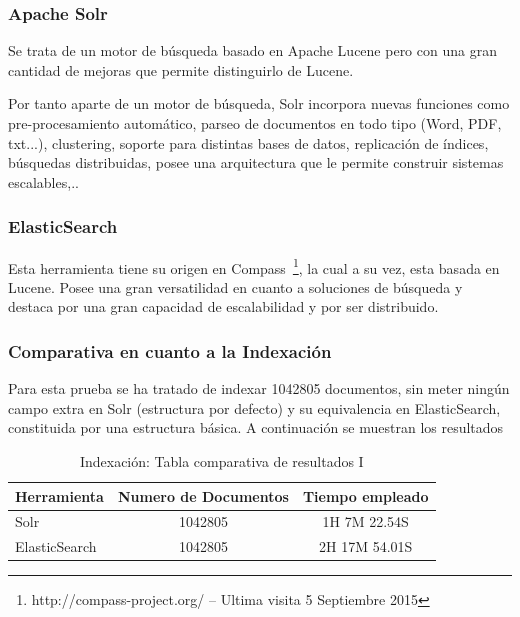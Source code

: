 \documentclass[runningheads,a4paper]{llncs}
\theoremstyle{break}
\newcommand{\rowstyle}[1]{\gdef\currentrowstyle{#1}%
  #1\ignorespaces
}
\begin{document}
\subsubsection{Apache Solr}
\textbf{}

Se trata de un motor de búsqueda basado en Apache Lucene pero con una gran cantidad de mejoras que permite distinguirlo de Lucene. 

Por tanto aparte de un motor de búsqueda, Solr incorpora nuevas funciones como pre-procesamiento automático, parseo de documentos en todo tipo (Word, PDF, txt...), clustering, soporte para distintas bases de datos, replicación de índices, búsquedas distribuidas, posee una arquitectura que le permite construir sistemas escalables,..


\subsubsection{ElasticSearch}
\textbf{}

Esta herramienta tiene su origen en Compass~\footnote{http://compass-project.org/ -- Ultima visita 5 Septiembre 2015}, la cual a su vez, esta basada en Lucene. Posee una gran versatilidad en cuanto a soluciones de búsqueda y destaca por una gran capacidad de escalabilidad y por ser distribuido.

\subsubsection{Comparativa en cuanto a la Indexación}
\textbf{}

Para esta prueba se ha tratado de indexar 1042805 documentos, sin meter ningún campo extra en Solr (estructura por defecto) y su equivalencia en ElasticSearch, constituida por una estructura básica. A continuación se muestran los resultados

\bgroup
\setlength{\tabcolsep}{10pt}
\def\arraystretch{1.8}
\begin{table}
\begin{center}
\begin{tabular}{p{2.2cm}|c|c}

\rowstyle{\bfseries} Herramienta & \rowstyle{\bfseries} Numero de Documentos & \rowstyle{\bfseries} Tiempo empleado \\ \hline
Solr          & 1042805 & 1H 7M 22.54S \\
ElasticSearch & 1042805 & 2H 17M 54.01S \\ \hline
\end{tabular}
\end{center}
\vspace{1em}
\caption{Indexación: Tabla comparativa de resultados I}
\end{table}
\egroup
\vspace{-1.5em}
\end{document}
